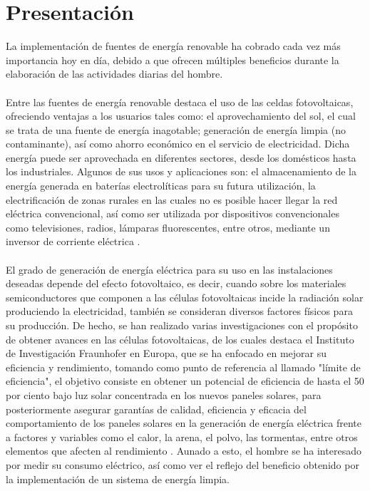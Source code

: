 
\section{Presentación} %
La implementación de fuentes de energía renovable ha cobrado cada vez más importancia hoy en día, debido a que ofrecen múltiples beneficios durante la elaboración de las actividades diarias del hombre. 
\paragraph{}
Entre las fuentes de energía renovable destaca el uso de las celdas fotovoltaicas, ofreciendo ventajas a los usuarios tales como: el aprovechamiento del sol, el cual se trata de una fuente de energía inagotable; generación de energía limpia (no contaminante), así como ahorro económico en el servicio de electricidad. Dicha energía puede ser aprovechada en diferentes sectores, desde los domésticos hasta los industriales. Algunos de sus usos y aplicaciones son: el almacenamiento de la energía generada en baterías electrolíticas para su futura utilización, la electrificación de zonas rurales en las cuales no es posible hacer llegar la red eléctrica convencional, así como ser utilizada por dispositivos convencionales como televisiones, radios, lámparas fluorescentes, entre otros, mediante un inversor de corriente eléctrica \citep{Pre1}.   
\paragraph{}
El grado de generación de energía eléctrica para su uso en las instalaciones deseadas depende del efecto fotovoltaico, es decir, cuando sobre los materiales semiconductores que componen a las células fotovoltaicas incide la radiación solar produciendo la electricidad, también se consideran diversos factores físicos para su producción. De hecho, se han realizado varias investigaciones con el propósito de obtener avances en las células fotovoltaicas, de los cuales destaca el Instituto de Investigación Fraunhofer en Europa, que se ha enfocado en mejorar su eficiencia y rendimiento, tomando como punto de referencia al llamado "límite de eficiencia", el objetivo consiste en obtener un potencial de eficiencia de hasta el 50 por ciento bajo luz solar concentrada en los nuevos paneles solares, para posteriormente asegurar garantías de calidad, eficiencia y eficacia del comportamiento de los paneles solares en la generación de energía eléctrica frente a factores y variables como el calor, la arena, el polvo, las tormentas, entre otros elementos que afecten al rendimiento \citep{Pre1}. Aunado a esto, el hombre se ha interesado por medir su consumo eléctrico, así como ver el reflejo del beneficio obtenido por la implementación de un sistema de energía limpia. 

